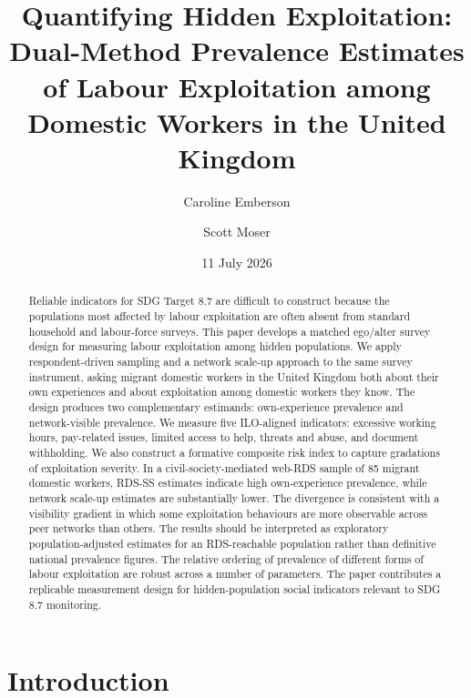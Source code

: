 \documentclass[
  12pt,
  letterpaper,
  DIV=11,
  numbers=noendperiod]{scrartcl}
\title{Quantifying Hidden Exploitation: Dual-Method Prevalence Estimates
of Labour Exploitation among Domestic Workers in the United Kingdom}
\author{Caroline Emberson \and Scott Moser}
\date{11 July 2026}
\begin{document}
\maketitle
\begin{abstract}
Reliable indicators for SDG Target 8.7 are difficult to construct
because the populations most affected by labour exploitation are often
absent from standard household and labour-force surveys. This paper
develops a matched ego/alter survey design for measuring labour
exploitation among hidden populations. We apply respondent-driven
sampling and a network scale-up approach to the same survey instrument,
asking migrant domestic workers in the United Kingdom both about their
own experiences and about exploitation among domestic workers they know.
The design produces two complementary estimands: own-experience
prevalence and network-visible prevalence. We measure five ILO-aligned
indicators: excessive working hours, pay-related issues, limited access
to help, threats and abuse, and document withholding. We also construct
a formative composite risk index to capture gradations of exploitation
severity. In a civil-society-mediated web-RDS sample of 85 migrant
domestic workers, RDS-SS estimates indicate high own-experience
prevalence, while network scale-up estimates are substantially lower.
The divergence is consistent with a visibility gradient in which some
exploitation behaviours are more observable across peer networks than
others. The results should be interpreted as exploratory
population-adjusted estimates for an RDS-reachable population rather
than definitive national prevalence figures. The relative ordering of
prevalence of different forms of labour exploitation are robust across a
number of parameters. The paper contributes a replicable measurement
design for hidden-population social indicators relevant to SDG 8.7
monitoring.
\end{abstract}


\section{Introduction}\label{sec-intro}
\end{document}
